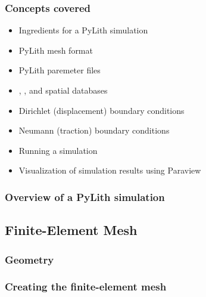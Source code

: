 \documentclass[aspectratio=169]{beamer}
\begin{document}
\begin{frame}
  \frametitle{Concepts covered}
  \summary{}

  \begin{itemize}
  \item Ingredients for a PyLith simulation
  \item PyLith  mesh format
  \item PyLith  paremeter files
  \item {}, , and  spatial databases
  \item Dirichlet (displacement) boundary conditions
  \item Neumann (traction) boundary conditions
  \item Running a simulation
  \item Visualization of simulation results using Paraview
  \end{itemize}

\end{frame}


\begin{frame}
  \frametitle{Overview of a PyLith simulation}
  \summary{}

  
\end{frame}


\subsection{Finite-Element Mesh}

\begin{frame}
  \frametitle{Geometry}
  \summary{}

  
\end{frame}


\begin{frame}
  \frametitle{Creating the finite-element mesh}

  
\end{frame}
\end{document}
